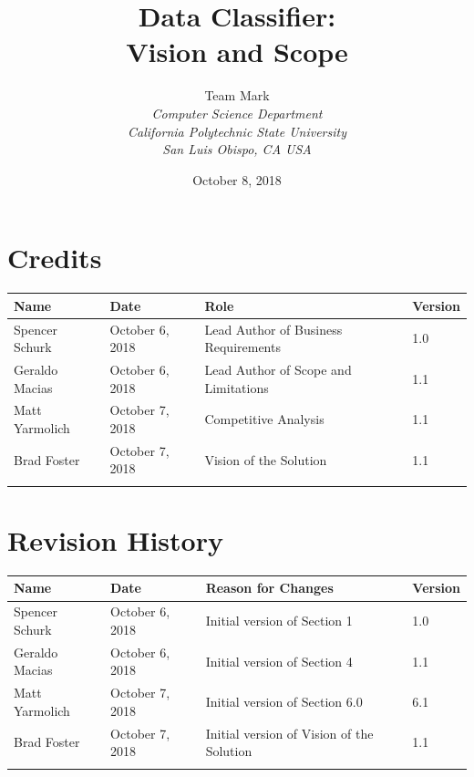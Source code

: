 \documentclass[12pt,oneside,letterpaper]{article}
\begin{document}
\title{\bfseries Data Classifier: \\Vision and Scope}

\author {
\large{Team Mark}\\
\emph{Computer Science Department}\\
\emph{California Polytechnic State University}\\
\emph{San Luis Obispo, CA USA}\\
}

\date{October 8, 2018}
\maketitle \thispagestyle{empty}

\pagebreak
\tableofcontents


\section*{Credits}
\begin{tabular}{|l|l|p{2in}|l|}
\hline
\textbf{Name}&\textbf{Date}&\textbf{Role}&\textbf{Version}\\
\hline
Spencer Schurk&October 6, 2018&Lead Author of Business Requirements&1.0\\
\hline
Geraldo Macias&October 6, 2018&Lead Author of Scope and Limitations&1.1\\
\hline
Matt Yarmolich&October 7, 2018&Competitive Analysis&1.1\\
\hline
Brad Foster&October 7, 2018&Vision of the Solution&1.1\\
\hline
&&&\\
\hline
\end{tabular}


\section*{Revision History}
\begin{tabular}{|l|l|p{2in}|l|}
\hline
\textbf{Name}&\textbf{Date}&\textbf{Reason for Changes}&\textbf{Version}\\
\hline
Spencer Schurk&October 6, 2018&Initial version of Section 1&1.0\\
\hline
Geraldo Macias&October 6, 2018&Initial version of Section 4&1.1\\
\hline
Matt Yarmolich&October 7, 2018&Initial version of Section 6.0&6.1\\
\hline
Brad Foster&October 7, 2018&Initial version of Vision of the Solution&1.1\\
\hline
&&&\\
\hline
\end{tabular}
\end{document}

